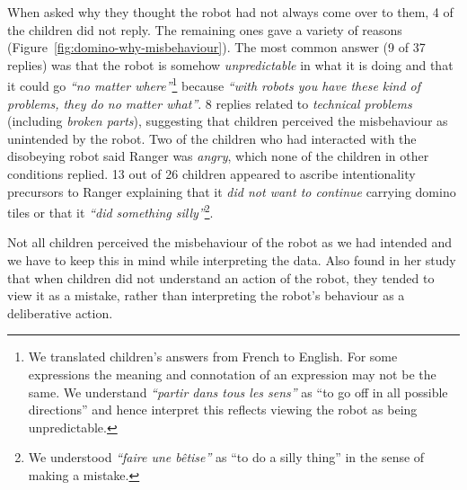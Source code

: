 \documentclass{sig-alternate}
\newcommand{\eg}{{\textit{e.g.~}}}
\begin{document}
When asked why they thought the robot had not always come over to them, 4 of the
children did not reply. The remaining ones gave a variety of reasons
(Figure~\ref{fig:domino-why-misbehaviour}). The most common answer (9 of 37
replies) was that the robot is somehow \textit{unpredictable} in what it is
doing and that it could go \textit{``no matter where''}\footnote{We translated
children's answers from French to English. For some expressions the meaning
and connotation of an expression may not be the same. We understand
\textit{``partir dans tous les sens''} as ``to go off in all possible
directions'' and hence interpret this reflects viewing the robot as being
unpredictable.} because \textit{``with robots you have these kind of problems,
they do no matter what''}. 8 replies related to \textit{technical problems}
(including \textit{broken parts}), suggesting that children perceived the
misbehaviour as unintended by the robot. Two of the children who had interacted
with the disobeying robot said Ranger was \textit{angry}, which none of the
children in other conditions replied. 13 out of 26 children appeared to ascribe
intentionality precursors to Ranger explaining that it \textit{did not want to
continue} carrying domino tiles or that it \textit{``did something
silly''}\footnote{We understood \textit{``faire une bêtise''} as ``to do a silly
thing'' in the sense of making a mistake.}.

Not all children perceived the misbehaviour of the robot as we had intended and
we have to keep this in mind while interpreting the data. Also
\cite{leite_long-term_2013} found in her study that when children did not
understand an action of the robot, they tended to view it as a mistake, rather
than interpreting the robot's behaviour as a deliberative action.


\end{document}
